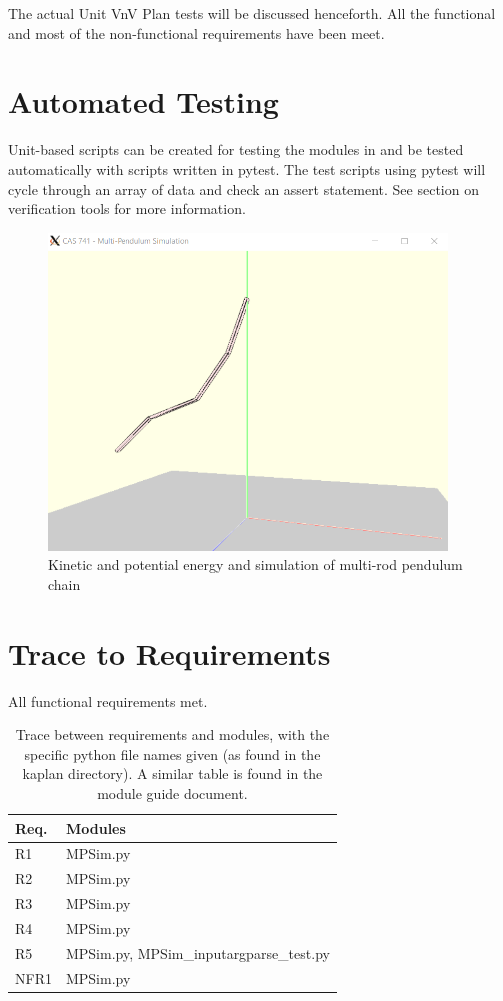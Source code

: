 \documentclass[12pt, titlepage]{article}
\begin{document}
The actual Unit VnV Plan tests will be discussed henceforth. All 
the functional and most of the non-functional requirements have been meet.

\section{Automated Testing}

Unit-based scripts can be created for testing the modules in \progname{}and be tested automatically with 
scripts written in pytest. The test scripts using pytest will cycle through an array of data and check an assert 
statement. See section on verification tools for more information.

\begin{figure}[H]
	\centering
	\includegraphics[width=400px]{MPSim.PNG}
	\caption{Kinetic and potential energy and simulation
	of multi-rod pendulum chain}
	\label{fig:PE-pend}
\end{figure}
		
\section{Trace to Requirements}

All functional requirements met.
\begin{table}[H]
	\centering
	\begin{tabular}{p{} p{}}
		\toprule
		\textbf{Req.} & \textbf{Modules}\\
		\midrule
		R1 & MPSim.py  \\
		R2 & MPSim.py  \\
		R3 & MPSim.py  \\
		R4 & MPSim.py  \\
		R5 & MPSim.py, MPSim\_inputargparse\_test.py \\
		NFR1 & MPSim.py \\
		\bottomrule
	\end{tabular}
	\caption{Trace between requirements and modules, with the specific python 
	file names given (as found in the kaplan directory). A similar table is 
	found in the module guide document.}
	\label{trace-RM}
\end{table}	
		
\end{document}
